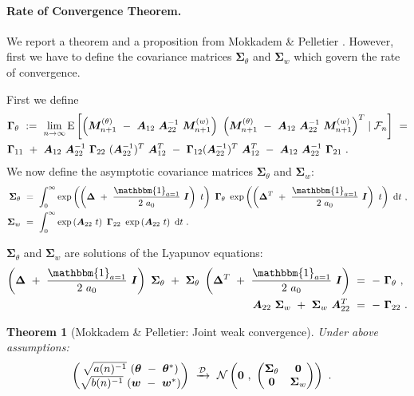 \documentclass{article}
\newtheorem{theorem}{Theorem}
\newcommand\Bw{\bm{w}}
\newcommand\BA{\bm{A}}
\newcommand\BI{\bm{I}}
\newcommand\BM{\bm{M}}
\newcommand\Bth{\bm{\theta}}
\newcommand\BDe{\bm{\Delta}}
\newcommand\BSi{\bm{\Sigma}}
\newcommand\BGa{\bm{\Gamma}}
\newcommand\BZe{\bm{0}}
\newcommand{\rE}{\mathrm{E}} \newcommand{\rF}{\mathrm{F}}
\begin{document}
\paragraph{Rate of Convergence Theorem.}

We report a theorem and a proposition from
Mokkadem \& Pelletier \cite{Mokkadem:06}.
However, first we have to define the covariance matrices
$\BSi_{\theta}$ and $\BSi_{w}$ which govern the rate of convergence.

First we define
\begin{align}
& \BGa_{\theta} \ := \
\lim_{n \to \infty} \rE \left[
\left( \BM^{(\theta)}_{n+1} \ - \ \BA_{12} \ \BA_{22}^{-1} \
\BM^{(w)}_{n+1} \right) \
\left( \BM^{(\theta)}_{n+1} \ - \ \BA_{12} \ \BA_{22}^{-1} \
\BM^{(w)}_{n+1} \right)^T
 \mid  \cF_n\right] \ = \\\nonumber
&\BGa_{11} \ + \  \BA_{12} \ \BA_{22}^{-1} \ \BGa_{22} \
  (\BA_{22}^{-1})^T \ \BA_{12}^T \ - \ \BGa_{12} (\BA_{22}^{-1})^T \
  \BA_{12}^T \ - \  \BA_{12} \ \BA_{22}^{-1} \ \BGa_{21} \ .
\end{align}
We now define the asymptotic covariance matrices $\BSi_{\theta}$ and
$\BSi_{w}$:
\begin{align}
\BSi_{\theta} \ &= \ \int_{0}^{\infty}
\exp \left(  \left(\BDe \ + \ \frac{\mathbbm{1}_{a=1}}{2 \ a_0} \ \BI
\right) \ t \right) \
\BGa_{\theta} \
\exp \left( \left(\BDe^T \ + \ \frac{\mathbbm{1}_{a=1}}{2 \ a_0} \ \BI
\right) \ t \right) \ \Rd t \ , \\
\BSi_{w} \ &= \ \int_{0}^{\infty}
\exp \left(   \BA_{22} \ t \right) \
\BGa_{22} \
\exp \left( \BA_{22} \ t \right) \ \Rd t \ .
\end{align}

$\BSi_{\theta}$ and $\BSi_{w}$ are solutions of the Lyapunov
equations:
\begin{align}
 \left(\BDe \ + \ \frac{\mathbbm{1}_{a=1}}{2 \ a_0} \ \BI
\right) \ \BSi_{\theta} \ + \ \BSi_{\theta} \ \left(\BDe^T \ + \
  \frac{\mathbbm{1}_{a=1}}{2 \ a_0} \ \BI \right)
\ &= \ - \ \BGa_{\theta} \ , \\
\BA_{22} \ \BSi_{w} \ + \ \BSi_{w}\ \BA_{22}^T \ &= \ - \  \BGa_{22} \ .
\end{align}


\begin{theorem}[Mokkadem \& Pelletier: Joint weak convergence]
\label{th:Mokkadem}
Under above assumptions:
\begin{align}
\begin{pmatrix}
\sqrt{a(n)^{-1}} \ (\Bth \ - \ \Bth^{*}) \\
\sqrt{b(n)^{-1}} \ (\Bw \ - \ \Bw^{*})
\end{pmatrix}
\ &\xrightarrow{\cD} \
\cN \left( \BZe \ , \
\begin{pmatrix}
\BSi_{\theta} & \BZe \\
\BZe & \BSi_{w}
\end{pmatrix}
\right) \ .
\end{align}
\end{theorem}
\end{document}
